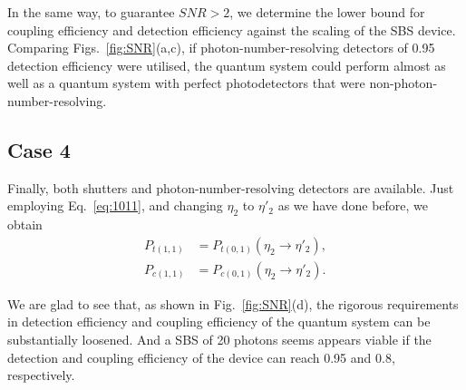 \documentclass[aps,rmp,twocolumn,amsmath,amssymb,nofootinbib,superscriptaddress]{revtex4}
\begin{document}
In the same way, to guarantee \mbox{$SNR > 2$}, we determine the lower bound for coupling efficiency and detection efficiency against the scaling of the SBS device. Comparing Figs.~\ref{fig:SNR}(a,c), if photon-number-resolving detectors of 0.95 detection efficiency were utilised, the quantum system could perform almost as well as a quantum system with perfect photodetectors that were non-photon-number-resolving.

\subsection{Case 4}

Finally, both shutters and photon-number-resolving detectors are available. Just employing Eq.~\ref{eq:1011}, and changing ${\eta _2}$ to ${\eta '_2} $ as we have done before, we obtain
\begin{align} \label{eq:1617}
{P_{t(1,1)}} &= {P_{t(0,1)}}({\eta _2} \to {\eta '_2} ), \nonumber \\
{P_{c(1,1)}} &= {P_{c(0,1)}}({\eta _2} \to {\eta '_2} ).
\end{align}

We are glad to see that, as shown in Fig.~\ref{fig:SNR}(d), the rigorous requirements in detection efficiency and coupling efficiency of the quantum system can be substantially loosened. And a SBS of 20 photons seems appears viable if the detection and coupling efficiency of the device can reach 0.95 and 0.8, respectively.

%
%


\end{document}
